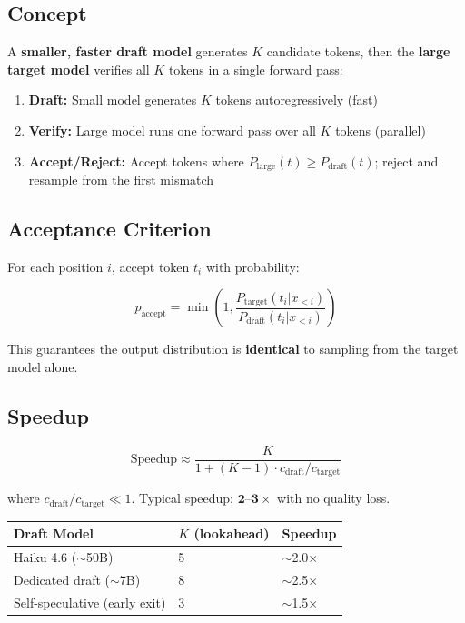 \documentclass[11pt,a4paper]{article}
\begin{document}
\subsection{Concept}

A \textbf{smaller, faster draft model} generates $K$ candidate tokens, then the \textbf{large target model} verifies all $K$ tokens in a single forward pass:

\begin{tcolorbox}[colback=gray!5, colframe=gray!60!black]
\begin{enumerate}[itemsep=1pt]
  \item \textbf{Draft:} Small model generates $K$ tokens autoregressively (fast)
  \item \textbf{Verify:} Large model runs one forward pass over all $K$ tokens (parallel)
  \item \textbf{Accept/Reject:} Accept tokens where $P_{\text{large}}(t) \geq P_{\text{draft}}(t)$; reject and resample from the first mismatch
\end{enumerate}
\end{tcolorbox}

\subsection{Acceptance Criterion}

For each position $i$, accept token $t_i$ with probability:

$$p_{\text{accept}} = \min\!\left(1, \frac{P_{\text{target}}(t_i | x_{<i})}{P_{\text{draft}}(t_i | x_{<i})}\right)$$

This guarantees the output distribution is \textbf{identical} to sampling from the target model alone.

\subsection{Speedup}

$$\text{Speedup} \approx \frac{K}{1 + (K-1) \cdot c_{\text{draft}}/c_{\text{target}}}$$

where $c_{\text{draft}}/c_{\text{target}} \ll 1$. Typical speedup: $\mathbf{2\text{--}3\times}$ with no quality loss.

\begin{center}
\begin{tabular}{lll}
\toprule
\textbf{Draft Model} & \textbf{$K$ (lookahead)} & \textbf{Speedup} \\
\midrule
Haiku 4.6 ($\sim$50B) & 5 & $\sim$2.0$\times$ \\
Dedicated draft ($\sim$7B) & 8 & $\sim$2.5$\times$ \\
Self-speculative (early exit) & 3 & $\sim$1.5$\times$ \\
\bottomrule
\end{tabular}
\end{center}
\end{document}
